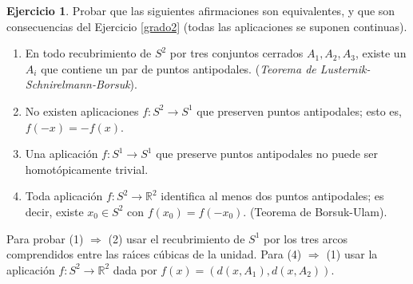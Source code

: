 \documentclass{article}
\theoremstyle{plain}
\theoremstyle{definition}
\newtheorem{exercise}{Ejercicio}
\newcommand{\R}{\mathbb{R}}
\begin{document}
\begin{exercise}
Probar que las siguientes afirmaciones son equivalentes, y que son consecuencias del Ejercicio \ref{grado2} (todas las aplicaciones se suponen continuas).
\begin{enumerate}
\item  En todo recubrimiento de $S^2$ por tres conjuntos cerrados $A_1, A_2, A_3$, existe un $A_i$ que contiene un par de puntos antipodales.
(\emph{Teorema de Lusternik-Schnirelmann-Borsuk}).
\item No existen aplicaciones $f: S^2\to S^1$ que preserven puntos antipodales; esto es, $f(-x) = -f(x)$.
\item Una aplicaci\'on $f: S^1\to S^1$ que preserve puntos antipodales no puede ser homot\'opicamente trivial.
\item Toda aplicaci\'on $f: S^2\to \R^2$ identifica al menos dos puntos
antipodales; es decir, existe $x_0\in S^2$ con $f(x_0) = f(-x_0)$. (Teorema de Borsuk-Ulam).
\end{enumerate}
Para probar  (1) $\Rightarrow$ (2) usar el recubrimiento de $S^1$ por los tres arcos comprendidos entre las ra\'{\i}ces c\'ubicas de la unidad. Para
(4) $\Rightarrow$ (1) usar la aplicaci\'on $f: S^2\to \mathbb{R}^2$ dada por $f(x) = (d(x,A_1), d(x,A_2))$.
\end{exercise}
\end{document}
